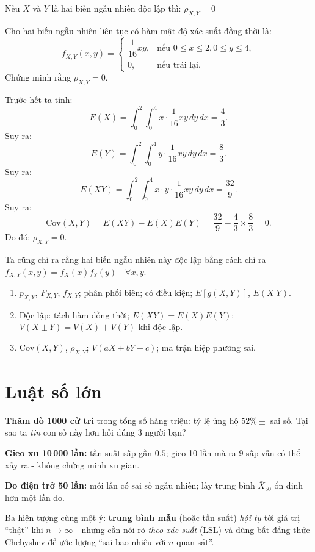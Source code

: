 \documentclass[12pt,a4paper]{article}
\begin{document}
\begin{dinhly}
  Nếu $X$ và $Y$ là hai biến ngẫu nhiên độc lập thì: $\rho_{X,Y} = 0$
\end{dinhly}

\begin{vidu}
Cho hai biến ngẫu nhiên liên tục có hàm mật độ xác suất đồng thời là:
\[
  f_{X,Y}(x, y) = \begin{cases}
    \dfrac{1}{16}xy, & \text{nếu } 0 \leq x \leq 2, 0 \leq y \leq 4, \\
    0, & \text{nếu trái lại.}
  \end{cases}
\]
Chứng minh rằng $\rho_{X,Y} = 0$.

Trước hết ta tính:
\[
  E(X) = \int_{0}^{2} \int_{0}^{4} x \cdot \dfrac{1}{16}xy \, dy \, dx = \dfrac{4}{3}.
\]
Suy ra:
\[
  E(Y) = \int_{0}^{2} \int_{0}^{4} y \cdot \dfrac{1}{16}xy \, dy \, dx = \dfrac{8}{3}.
\]
Suy ra:
\[
  E(XY) = \int_{0}^{2} \int_{0}^{4} x \cdot y \cdot \dfrac{1}{16}xy \, dy \, dx = \dfrac{32}{9}.
\]
Suy ra:
\[
  \mathrm{Cov}(X, Y) = E(XY) - E(X)E(Y) = \dfrac{32}{9} - \dfrac{4}{3} \times \dfrac{8}{3} = 0.
\]
Do đó: $\rho_{X,Y} = 0$.

Ta cũng chỉ ra rằng hai biến ngẫu nhiên này độc lập bằng cách chỉ ra $f_{X,Y}(x, y) = f_X(x)f_Y(y) \quad \forall x, y$.
\end{vidu}

\begin{tongket}[title={Tổng kết: Biến ngẫu nhiên nhiều chiều}]
\begin{enumerate}
  \item $p_{X,Y}$, $F_{X,Y}$, $f_{X,Y}$; phân phối biên; có điều kiện; $E[g(X,Y)]$, $E(X|Y)$.
  \item Độc lập: tách hàm đồng thời; $E(XY) = E(X)E(Y)$; $V(X \pm Y) = V(X) + V(Y)$ khi độc lập.
  \item $\mathrm{Cov}(X,Y)$, $\rho_{X,Y}$; $V(aX + bY + c)$; ma trận hiệp phương sai.
\end{enumerate}
\end{tongket}

\section{Luật số lớn}

\begin{dongco}[title={Động cơ học -- Thăm dò ý kiến và đo lường}]
\textbf{Thăm dò 1000 cử tri} trong tổng số hàng triệu: tỷ lệ ủng hộ $52\% \pm$ sai số. Tại sao ta \emph{tin} con số này hơn hỏi đúng 3 người bạn?

\textbf{Gieo xu 10\,000 lần:} tần suất sấp gần $0.5$; gieo 10 lần mà ra 9 sấp vẫn có thể xảy ra - không chứng minh xu gian.

\textbf{Đo điện trở 50 lần:} mỗi lần có sai số ngẫu nhiên; lấy trung bình $\bar{X}_{50}$ ổn định hơn một lần đo.

Ba hiện tượng cùng một ý: \textbf{trung bình mẫu} (hoặc tần suất) \emph{hội tụ} tới giá trị ``thật'' khi $n \to \infty$ - nhưng cần nói rõ \emph{theo xác suất} (LSL) và dùng bất đẳng thức Chebyshev để ước lượng ``sai bao nhiêu với $n$ quan sát''.
\end{dongco}
\end{document}
